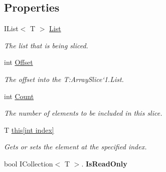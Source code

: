 \subsection*{Properties}
\begin{DoxyCompactItemize}
\item 
I\+List$<$ T $>$ \hyperlink{struct_shared_memory_1_1_utilities_1_1_array_slice_a00256cdc0e020cd68be8ce540235f444}{List}
\begin{DoxyCompactList}\small\item\em The list that is being sliced. \end{DoxyCompactList}\item 
int \hyperlink{struct_shared_memory_1_1_utilities_1_1_array_slice_a29fda569ef03615274d3fa52479f7071}{Offset}
\begin{DoxyCompactList}\small\item\em The offset into the T\+:\+Array\+Slice`1.\+List. \end{DoxyCompactList}\item 
int \hyperlink{struct_shared_memory_1_1_utilities_1_1_array_slice_a5ab8162c11faf02450fff26c1f3f16cd}{Count}
\begin{DoxyCompactList}\small\item\em The number of elements to be included in this slice. \end{DoxyCompactList}\item 
T \hyperlink{struct_shared_memory_1_1_utilities_1_1_array_slice_a10c90e7c6b4316027afd33895119d7b8}{this\mbox{[}int index\mbox{]}}
\begin{DoxyCompactList}\small\item\em Gets or sets the element at the specified index.\end{DoxyCompactList}\item 
\mbox{\label{struct_shared_memory_1_1_utilities_1_1_array_slice_a7685ef8466e2acc47fb18fdf8f25012b}} 
bool I\+Collection$<$ T $>$. {\bfseries Is\+Read\+Only}
\end{DoxyCompactItemize}


